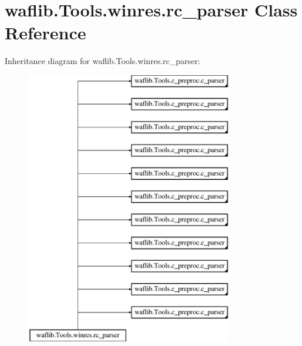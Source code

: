 \hypertarget{classwaflib_1_1_tools_1_1winres_1_1rc__parser}{}\section{waflib.\+Tools.\+winres.\+rc\+\_\+parser Class Reference}
\label{classwaflib_1_1_tools_1_1winres_1_1rc__parser}
Inheritance diagram for waflib.\+Tools.\+winres.\+rc\+\_\+parser\+:\begin{figure}[H]
\begin{center}
\leavevmode
\includegraphics[height=12.000000cm]{classwaflib_1_1_tools_1_1winres_1_1rc__parser}
\end{center}
\end{figure}

